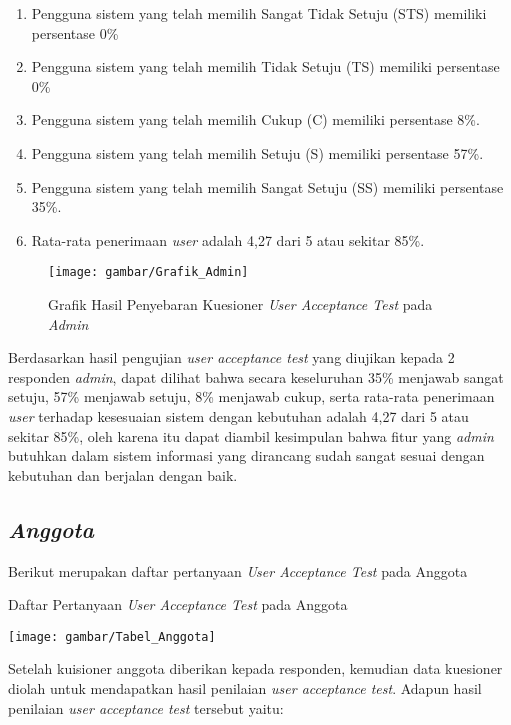 \begin{enumerate}
	\item Pengguna sistem yang telah memilih Sangat Tidak Setuju (STS) memiliki persentase 0\%
	\item Pengguna sistem yang telah memilih Tidak Setuju (TS) memiliki persentase 0\%
	\item Pengguna sistem yang telah memilih Cukup (C) memiliki persentase 8\%.
	\item Pengguna sistem yang telah memilih Setuju (S) memiliki persentase 57\%.
	\item Pengguna sistem yang telah memilih Sangat Setuju (SS) memiliki persentase 35\%.
	\item Rata-rata penerimaan \textit{user} adalah 4,27 dari 5 atau sekitar 85\%.
\end{enumerate}

\begin{figure}[H]
	\centering
	\texttt{[image: gambar/Grafik\_Admin]}
	\caption{Grafik Hasil Penyebaran Kuesioner \textit{User Acceptance Test} pada \textit{Admin}}
\end{figure}

Berdasarkan hasil pengujian \textit{user acceptance test} yang diujikan kepada 2 responden \textit{admin}, dapat dilihat bahwa secara keseluruhan 35\% menjawab sangat setuju, 57\% menjawab setuju, 8\% menjawab cukup, serta rata-rata penerimaan \textit{user} terhadap kesesuaian sistem dengan kebutuhan adalah 4,27 dari 5 atau sekitar 85\%, oleh karena itu dapat diambil kesimpulan bahwa fitur yang \textit{admin} butuhkan dalam sistem informasi yang dirancang sudah sangat sesuai dengan kebutuhan dan berjalan dengan baik.  

\subsection{\textit{Anggota}}
Berikut merupakan daftar pertanyaan \textit{User Acceptance Test} pada Anggota

\begin{table}[H]
	\centering
	\caption{Daftar Pertanyaan \textit{User Acceptance Test} pada Anggota}
	\texttt{[image: gambar/Tabel\_Anggota]}
\end{table}

Setelah kuisioner anggota diberikan kepada responden, kemudian data kuesioner diolah untuk mendapatkan hasil penilaian \textit{user acceptance test}. Adapun hasil penilaian \textit{user acceptance test} tersebut yaitu:

